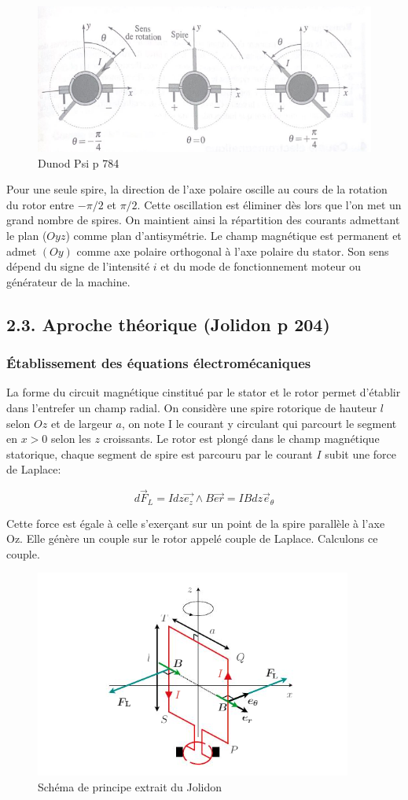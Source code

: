 \documentclass[french, a4paper, 10pt, twocolumn, landscape]{article}
\begin{document}
\begin{figure}[ht]
	\centering
	\includegraphics[width=.5\linewidth]{./figures/collecteur3.png}
	\caption{Dunod Psi p 784}
\end{figure}

Pour une seule spire, la direction de l'axe polaire oscille au cours de la rotation du rotor entre $-\pi/2$ et $\pi/2$. Cette oscillation est éliminer dès lors que l'on met un grand nombre de spires. On maintient ainsi la répartition des courants admettant le plan ($Oyz$) comme plan d'antisymétrie. Le champ magnétique est permanent et admet $(Oy)$ comme axe polaire orthogonal à l'axe polaire du stator. Son sens dépend du signe de l'intensité $i$ et du mode de fonctionnement moteur ou générateur de la machine.


\subsection*{2.3. Aproche théorique (Jolidon p 204)}

\subsubsection*{Établissement des équations électromécaniques}

La forme du circuit magnétique cinstitué par le stator et le rotor permet d'établir dans l'entrefer un champ radial. On considère une spire rotorique de hauteur $l$ selon $Oz$ et de largeur $a$, on note I le courant y circulant qui parcourt le segment en $x>0$ selon les $z$ croissants. Le rotor est plongé dans le champ magnétique statorique, chaque segment de spire est parcouru par le courant $I$ subit une force de Laplace:


\begin{equation}
	 d\vec{F}_L =  Idz\vec{e_z}\wedge B\vec{er} = IBdz\vec{e}_\theta
\end{equation}

Cette force est égale à celle s'exerçant sur un point de la spire parallèle à l'axe Oz. Elle génère un couple sur le rotor appelé couple de Laplace. Calculons ce couple.

\begin{figure}[ht]
	\centering
	\includegraphics[width=.5\linewidth]{./figures/SchemaPrincipe.png}
	\caption{Schéma de principe extrait du Jolidon}
\end{figure}
\end{document}
